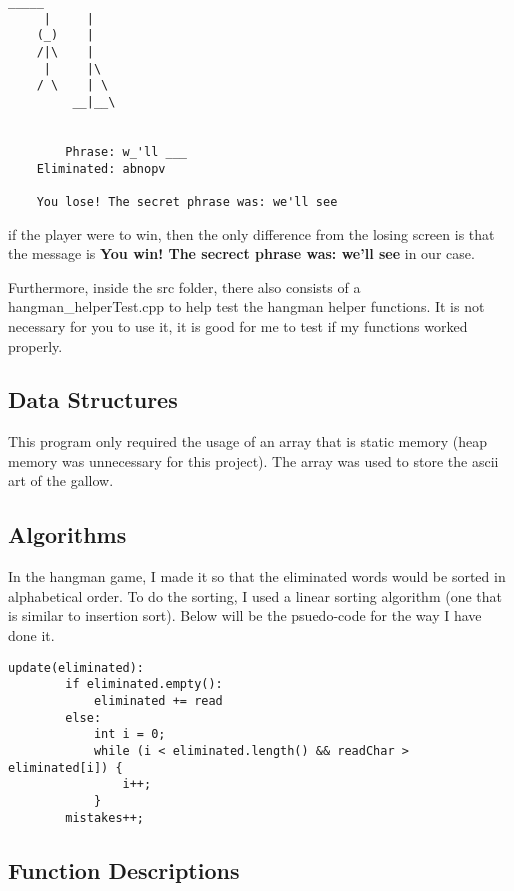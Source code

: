 \documentclass{article}
\begin{document}
\begin{Verbatim}[frame=single, label={example losing screen}]
      _____
     |     |
    (_)    |
    /|\    |
     |     |\
    / \    | \
         __|__\
    
    
        Phrase: w_'ll ___
    Eliminated: abnopv
    
    You lose! The secret phrase was: we'll see
\end{Verbatim}

if the player were to win, then the only difference from the losing screen is that the message is \textbf{You win! The secrect phrase was: we'll see} in our case.

Furthermore, inside the src folder, there also consists of a hangman\_helperTest.cpp to help test the hangman helper functions. It is not necessary for you to use it, it is good for me to test if my functions worked properly. 

\subsection{Data Structures}

This program only required the usage of an array that is static memory (heap memory was unnecessary for this project). The array was used to store the ascii art of the gallow.

\subsection{Algorithms}

In the hangman game, I made it so that the eliminated words would be sorted in alphabetical order. To do the sorting, I used a linear sorting algorithm (one that is similar to insertion sort). Below will be the psuedo-code for the way I have done it.

\begin{Verbatim}[frame=single, label={update(eliminated)}]
    update(eliminated):
        if eliminated.empty():
            eliminated += read
        else:
            int i = 0;
            while (i < eliminated.length() && readChar > eliminated[i]) {
                i++;
            }
        mistakes++; 
\end{Verbatim}

\subsection{Function Descriptions}
\end{document}
